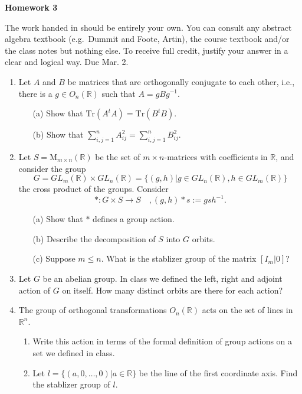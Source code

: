 \documentclass[12pt]{article}
\title{}
\date{}
\theoremstyle{plain}
\theoremstyle{definition}
\theoremstyle{remark}
\newcommand{\R}{\mathbb{R}}
\newcommand{\lra}{\longrightarrow}
\begin{document}
\begin{center}
{\Large \bf Homework 3}
\end{center}
The work handed in should be entirely your own. You can consult any abstract algebra textbook (e.g.~Dummit and Foote, Artin), the course textbook and/or the class notes but nothing else. To receive full credit, justify your answer in a clear and logical way. Due Mar. 2.

\begin{enumerate}
\item Let $A$ and $B$ be matrices that are orthogonally conjugate to each other, i.e., there is a $g\in O_n(\R)$ such that $A=gBg^{-1}$.
\begin{enumerate}
\item[(a)] Show that $\mathrm{Tr}(A^tA)=\mathrm{Tr}(B^tB)$.
\item[(b)] Show that $\sum_{i,j=1}^n A_{ij}^2=\sum_{i,j=1}^n B_{ij}^2$.
\end{enumerate}

\item Let $S=\mathrm{M}_{m\times n}(\R)$ be the set of $m\times n$-matrices with coefficients in $\R$, and consider the group 
$$
G=GL_m(\R)\times GL_n(\R)=\{(g,h)|g\in GL_n(\R),h\in GL_m(\R)\}
$$ the cross product of the groups. Consider
\[
*:G\times S\lra S\quad, (g,h)*s:= gsh^{-1} .
\]
\begin{enumerate}
\item[(a)] Show that $*$ defines a group action.
\item[(b)] Describe the decomposition of $S$ into $G$ orbits.
\item[(c)] Suppose $m\leq n$. What is the stablizer group of the matrix $[I_m|0]$?
\end{enumerate}

\item Let $G$ be an abelian group. In class we defined the left, right and adjoint action of $G$ on itself. How many distinct orbits are there for each action?

\item The group of orthogonal transformations $O_n(\R)$ acts on the set of lines in $\R^n$. 
\begin{enumerate}
\item Write this action in terms of the formal definition of group actions on a set we defined in class.
\item Let $l=\{(a,0,\dots,0)|a\in \R\}$ be the line of the first coordinate axis. Find the stablizer group of $l$.
\end{enumerate}


\end{enumerate}
\end{document}
